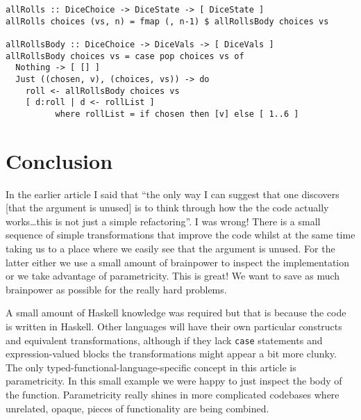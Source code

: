 \begin{verbatim}
allRolls :: DiceChoice -> DiceState -> [ DiceState ]
allRolls choices (vs, n) = fmap (, n-1) $ allRollsBody choices vs

allRollsBody :: DiceChoice -> DiceVals -> [ DiceVals ]
allRollsBody choices vs = case pop choices vs of
  Nothing -> [ [] ]
  Just ((chosen, v), (choices, vs)) -> do
    roll <- allRollsBody choices vs
    [ d:roll | d <- rollList ]
          where rollList = if chosen then [v] else [ 1..6 ]
\end{verbatim}


\section{Conclusion}


In the earlier article I said that ``the only way I can suggest that one discovers [that the argument is unused] is to think through how the the code actually works\ldots this is not just a simple refactoring''. I was wrong! There is a small sequence of simple transformations that improve the code whilst at the same time taking us to a place where we easily see that the argument is unused. For the latter either we use a small amount of brainpower to inspect the implementation or we take advantage of parametricity. This is great! We want to save as much brainpower as possible for the really hard problems.

A small amount of Haskell knowledge was required but that is because the code is written in Haskell. Other languages will have their own particular constructs and equivalent transformations, although if they lack \texttt{case} statements and expression-valued blocks the transformations might appear a bit more clunky. The only typed-functional-language-specific concept in this article is parametricity. In this small example we were happy to just inspect the body of the function. Parametricity really shines in more complicated codebases where unrelated, opaque, pieces of functionality are being combined.








